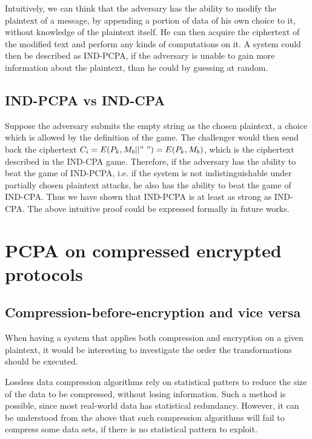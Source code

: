 Intuitively, we can think that the adversary has the ability to modify the plaintext of a message, by appending a portion of data of his own choice to it, without knowledge of the plaintext itself. He can then acquire the ciphertext of the modified text and perform any kinds of computations on it. A system could then be described as IND-PCPA, if the adversary is unable to gain more information about the plaintext, than he could by guessing at random.

\subsection{IND-PCPA vs IND-CPA}

Suppose the adversary submits the empty string as the chosen plaintext, a choice which is allowed by the definition of the game. The challenger would then send back the ciphertext \begin{math}C_i = E(P_k, M_b||"\ ") = E(P_k, M_b)\end{math}, which is the ciphertext described in the IND-CPA game. Therefore, if the adversary has the ability to beat the game of IND-PCPA, i.e. if the system is not indistinguishable under partially chosen plaintext attacks, he also has the ability to beat the game of IND-CPA. Thus we have shown that IND-PCPA is at least as strong as IND-CPA. The above intuitive proof could be expressed formally in future works.

\section{PCPA on compressed encrypted protocols}

\subsection{Compression-before-encryption and vice versa}
When having a system that applies both compression and encryption on a given plaintext, it would be interesting to investigate the order the transformations should be executed.

Lossless data compression algorithms rely on statistical patters to reduce the size of the data to be compressed, without losing information. Such a method is possible, since most real-world data has statistical redundancy. However, it can be understood from the above that such compression algorithms will fail to compress some data sets, if there is no statistical pattern to exploit.

